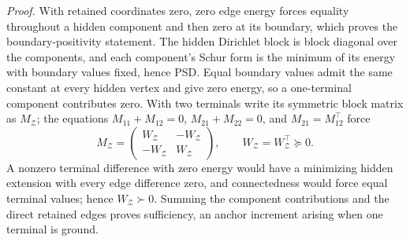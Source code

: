 \noindent\emph{Proof.}
With retained coordinates zero, zero edge energy forces equality throughout a
hidden component and then zero at its boundary, which proves the
boundary-positivity statement. The hidden Dirichlet block is block diagonal over
the components, and each component's Schur form is the minimum of its energy
with boundary values fixed, hence PSD. Equal boundary values admit the same
constant at every hidden vertex and give zero energy, so a one-terminal
component contributes zero. With two terminals write its symmetric block matrix
as \(M_{\mathcal Z}\); the equations \(M_{11}+M_{12}=0\), \(M_{21}+M_{22}=0\), and
\(M_{21}=M_{12}^\top\) force
\begin{equation}
M_{\mathcal Z}=\begin{pmatrix}W_{\mathcal Z}&-W_{\mathcal Z}\\-W_{\mathcal Z}&W_{\mathcal Z}\end{pmatrix},
\qquad W_{\mathcal Z}=W_{\mathcal Z}^\top\succeq0.
\label{eq:cg-kron-two-terminal-response}
\end{equation}
A nonzero terminal difference with zero energy would have a minimizing hidden
extension with every edge difference zero, and connectedness would force equal
terminal values; hence \(W_{\mathcal Z}\succ0\). Summing the component
contributions and the direct retained edges proves sufficiency, an anchor
increment arising when one terminal is ground.


